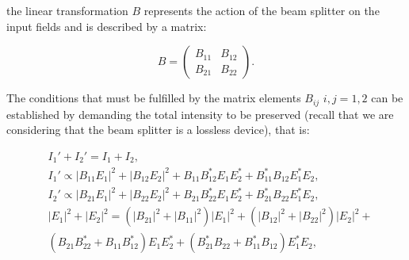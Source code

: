 \documentclass{book}
\begin{document}
the linear transformation $B$ represents the action of the beam splitter on the input fields and is described by a matrix:

\begin{equation}
B=\begin{pmatrix} B_{11}& B_{12} \\B_{21} & B_{22} \end{pmatrix}.
\end{equation}

The conditions  that must be fulfilled by the matrix elements $B_{ij}$  $i,j=1,2$  can be established by demanding the total intensity to be preserved (recall that we are considering that the beam splitter is a lossless device), that is:

\begin{align}
&I_{1}'+I_{2}'=I_{1}+I_{2}, \\
&I_{1}'\propto|B_{11} E_{1}|^{2}+|B_{12} E_{2}|^{2}+B_{11} B_{12}^{*} E_{1} E_{2}^{*}+B_{11}^{*} B_{12} E_{1}^{*} E_{2}, \\
&I_{2}'\propto|B_{21} E_{1}|^{2}+|B_{22} E_{2}|^{2}+B_{21} B_{22}^{*} E_{1} E_{2}^{*}+B_{21}^{*} B_{22} E_{1}^{*} E_{2},\\
&|E_{1}|^{2}+|E_{2}|^{2}=(|B_{21}|^{2}+|B_{11}|^{2})|E_{1}|^{2}+(|B_{12}|^{2}+|B_{22}|^{2})|E_{2}|^{2}+\\
&(B_{21} B_{22}^{*}+B_{11} B_{12}^{*})E_{1} E_{2}^{*}+(B_{21}^{*} B_{22}+B_{11}^{*} B_{12})E_{1}^{*} E_{2},
\end{align}
\end{document}
